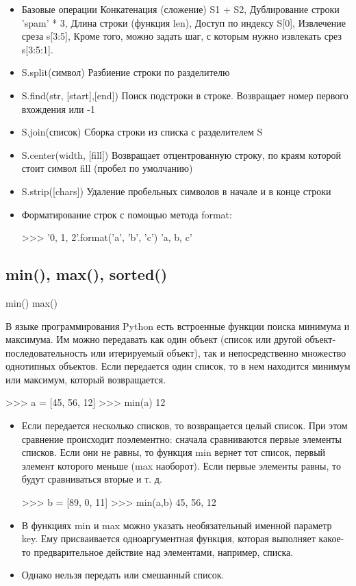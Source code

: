 	\begin{itemize}

		\item Базовые операции
		Конкатенация (сложение) S1 + S2, Дублирование строки 'spam' * 3, Длина строки (функция len), Доступ по индексу S[0], Извлечение среза s[3:5], Кроме того, можно задать шаг, с которым нужно извлекать срез s[3:5:1].
		\item S.split(символ)	Разбиение строки по разделителю
		\item S.find(str, [start],[end])	Поиск подстроки в строке. Возвращает номер первого вхождения или -1
		\item S.join(список)	Сборка строки из списка с разделителем S
		\item S.center(width, [fill])	Возвращает отцентрованную строку, по краям которой стоит символ fill (пробел по умолчанию)
		\item S.strip([chars])	Удаление пробельных символов в начале и в конце строки
		\item Форматирование строк с помощью метода format:
		\begin{python}
			>>> '{0}, {1}, {2}'.format('a', 'b', 'c')
			'a, b, c'
		\end{python}
	\end{itemize}

\subsection{min(), max(), sorted()}

	min() max()

		В языке программирования Python есть встроенные функции поиска минимума и максимума. Им можно передавать как один объект (список или другой объект-последовательность или итерируемый объект), так и непосредственно множество однотипных объектов. Если передается один список, то в нем находится минимум или максимум, который возвращается.
	\begin{python}
		>>> a = [45, 56, 12]
		>>> min(a)
		12
	\end{python}
	\begin{itemize}

		\item Если передается несколько списков, то возвращается целый список. При этом сравнение происходит поэлементно: сначала сравниваются первые элементы списков. Если они не равны, то функция min вернет тот список, первый элемент которого меньше (max наоборот). Если первые элементы равны, то будут сравниваться вторые и т. д.
		\begin{python}
>>> b = [89, 0, 11]
>>> min(a,b)
45, 56, 12
		\end{python}
		\item В функциях min и max можно указать необязательный именной параметр key. Ему присваивается одноаргументная функция, которая выполняет какое-то предварительное действие над элементами, например, списка.
		\item Однако нельзя передать или смешанный список.
	\end{itemize}

